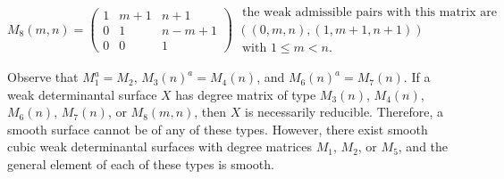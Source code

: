 \documentclass[12pt,reqno]{amsart}
\theoremstyle{plain}
\theoremstyle{definition}
\theoremstyle{remark}
\theoremstyle{definition}
\begin{document}

 $$ M_{8}(m,n)=\left( \begin{array}{ccc}
1 & m+1 & n+1\\
0 & 1 & n-m+1 \\
0 & 0 & 1
\end{array}
    \right) \begin{array}{c}\text{ the weak admissible pairs with this matrix are } \\ 
    ((0,m, n),(1, m+1, n+1)) \\
    \text{ with } 1\leq m<n.\end{array}$$

Observe that $M_{1}^{a}=M_{2}$, $M_{3}(n)^{a}=M_{4}(n)$, and $M_{6}(n)^{a}=M_{7}(n)$. If a weak determinantal surface $X$ has degree matrix of type $M_{3}(n)$, $M_{4}(n)$, $M_{6}(n)$, $M_{7}(n)$, or $M_{8}(m,n)$, then $X$ is necessarily reducible. Therefore, a smooth surface cannot be of any of these types. However, there exist smooth cubic weak determinantal surfaces with degree matrices $M_{1}$, $M_{2}$, or $M_{5}$, and the general element of each of these types is smooth.
\end{document}
